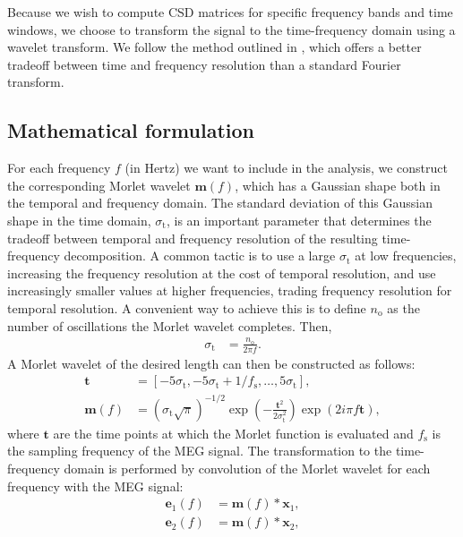 \documentclass[utf8]{frontiersSCNS}
\newcommand{\textcite}[1]{\citet{#1}}
\newcommand{\bm}[1]{\mathbf{#1}}
\renewcommand{\vec}[1]{\bm{#1}}
\begin{document}
Because we wish to compute CSD matrices for specific frequency bands and time windows, we choose to transform the signal to the time-frequency domain using a wavelet transform.
We follow the method outlined in \textcite{TallonBaudry1997}, which offers a better tradeoff between time and frequency resolution than a standard Fourier transform.

\subsection{Mathematical formulation}

For each frequency $f$ (in Hertz) we want to include in the analysis, we construct the corresponding Morlet wavelet $\vec{m}(f)$, which has a Gaussian shape both in the temporal and frequency domain.
The standard deviation of this Gaussian shape in the time domain, $\sigma_\text{t}$, is an important parameter that determines the tradeoff between temporal and frequency resolution of the resulting time-frequency decomposition.
A common tactic is to use a large $\sigma_\text{t}$ at low frequencies, increasing the frequency resolution at the cost of temporal resolution, and use increasingly smaller values at higher frequencies, trading frequency resolution for temporal resolution.
A convenient way to achieve this is to define $n_\text{o}$ as the number of oscillations the Morlet wavelet completes. Then,
\begin{align}\label{eq:oscillations}
    \sigma_\text{t} &= \frac{n_\text{o}}{2 \pi f}.
\end{align}
A Morlet wavelet of the desired length can then be constructed as follows:
\begin{align}\label{eq:wavelet}
    \vec{t} &= [-5\sigma_\text{t}, -5\sigma_\text{t} + 1/f_\text{s}, \ldots, 5\sigma_\text{t}], \\
    \vec{m}(f) &= (\sigma_\text{t} \sqrt{\pi})^{-1/2} \exp(-\frac{\vec{t}^2}{2 \sigma_\text{t}^2}) \exp(2 i \pi f \vec{t}),
\end{align}
where $\vec{t}$ are the time points at which the Morlet function is evaluated and $f_\text{s}$ is the sampling frequency of the MEG signal.
The transformation to the time-frequency domain is performed by convolution of the Morlet wavelet for each frequency with the MEG signal:
\begin{align}\label{eq:energy}
    \vec{e}_1(f) &= \vec{m}(f) * \vec{x}_1, \\
    \vec{e}_2(f) &= \vec{m}(f) * \vec{x}_2,
\end{align}
\end{document}
